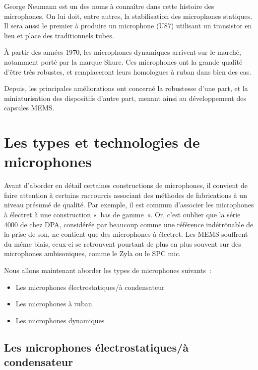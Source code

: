 \documentclass[
]{book}
\providecommand{\tightlist}{%
  \setlength{\itemsep}{0pt}\setlength{\parskip}{0pt}}
\begin{document}
George Neumann est un des noms à connaître dans cette histoire des microphones. On lui doit, entre autres, la stabilisation des microphones statiques. Il sera aussi le premier à produire un microphone (U87) utilisant un transistor en lieu et place des traditionnels tubes.

À partir des années 1970, les microphones dynamiques arrivent sur le marché, notamment porté par la marque Shure. Ces microphones ont la grande qualité d'être très robustes, et remplaceront leurs homologues à ruban dans bien des cas.

Depuis, les principales améliorations ont concerné la robustesse d'une part, et la miniaturisation des dispositifs d'autre part, menant ainsi au développement des capsules MEMS.

\hypertarget{les-types-et-technologies-de-microphones}{%
\section{Les types et technologies de microphones}\label{les-types-et-technologies-de-microphones}}

Avant d'aborder en détail certaines constructions de microphones, il convient de faire attention à certains raccourcis associant des méthodes de fabrications à un niveau présumé de qualité. Par exemple, il est commun d'associer les microphones à électret à une construction «~bas de gamme~». Or, c'est oublier que la série 4000 de chez DPA, considérée par beaucoup comme une référence indétrônable de la prise de son, ne contient que des microphones à électret. Les MEMS souffrent du même biais, ceux-ci se retrouvent pourtant de plus en plus souvent sur des microphones ambisoniques, comme le Zyla ou le SPC mic.

Nous allons maintenant aborder les types de microphones suivants~:

\begin{itemize}
\tightlist
\item
  Les microphones électrostatiques/à condensateur
\item
  Les microphones à ruban
\item
  Les microphones dynamiques
\end{itemize}

\hypertarget{les-microphones-uxe9lectrostatiquesuxe0-condensateur}{%
\subsection{Les microphones électrostatiques/à condensateur}\label{les-microphones-uxe9lectrostatiquesuxe0-condensateur}}
\end{document}
